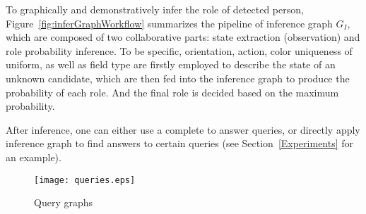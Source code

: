 To graphically and demonstratively infer the role of detected person,  Figure~\ref{fig:inferGraphWorkflow} summarizes the pipeline of inference graph $G_I$, which are composed of two collaborative parts: state extraction (observation) and role probability inference. To be specific, orientation, action, color uniqueness of uniform, as well as field type are firstly employed to describe the state of an unknown candidate, which are then fed into the inference graph to produce the probability of each role. 
And the final role is decided based on the maximum probability. 

After inference, one can either use a complete  to answer queries, or directly apply inference graph to find answers to certain queries (see Section~\ref{Experiments} for an example). 


\begin{figure}[tb!]
\centering
\texttt{[image: queries.eps]}
\caption{Query graphs}
\label{fig:queries}
\end{figure}